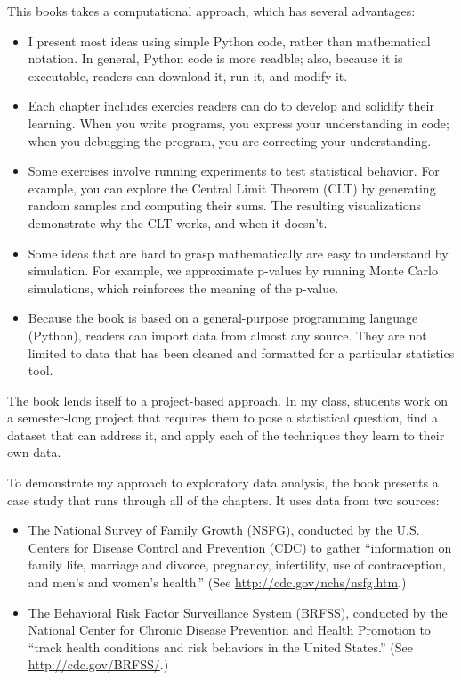 \documentclass[12pt]{book}
\begin{document}
This books takes a computational approach, which has several
advantages:

\begin{itemize}

\item I present most ideas using simple Python code, rather than
  mathematical notation.  In general, Python code is more readble;
  also, because it is executable, readers can download it, run it,
  and modify it.

\item Each chapter includes exercies readers can do to develop
  and solidify their learning.  When you write programs, you
  express your understanding in code; when you debugging the
  program, you are correcting your understanding.

\item Some exercises involve running experiments to test statistical
  behavior.  For example, you can explore the Central Limit Theorem
  (CLT) by generating random samples and computing their sums.  The
  resulting visualizations demonstrate why the CLT works, and when
  it doesn't.

\item Some ideas that are hard to grasp mathematically are easy to
  understand by simulation.  For example, we approximate p-values by
  running Monte Carlo simulations, which reinforces the meaning of the
  p-value.

\item Because the book is based on a general-purpose programming language
  (Python), readers can import data from almost any
  source.  They are not limited to data that has been cleaned and
  formatted for a particular statistics tool.

\end{itemize}

The book lends itself to a project-based approach.  In my class,
students work on a semester-long project that requires them to pose a
statistical question, find a dataset that can address it, and apply
each of the techniques they learn to their own data.

To demonstrate my approach to exploratory data analysis, the book
presents a case study that runs through all of the chapters.  It uses
data from two sources:

\begin{itemize}

\item The National Survey of Family Growth (NSFG), conducted by the
  U.S. Centers for Disease Control and Prevention (CDC) to gather
  ``information on family life, marriage and divorce, pregnancy,
  infertility, use of contraception, and men's and women's health.''
  (See \url{http://cdc.gov/nchs/nsfg.htm}.)

\item The Behavioral Risk Factor Surveillance System (BRFSS),
  conducted by the National Center for Chronic Disease Prevention and
  Health Promotion to ``track health conditions and risk behaviors in
  the United States.''  (See \url{http://cdc.gov/BRFSS/}.)

\end{itemize}
\end{document}
